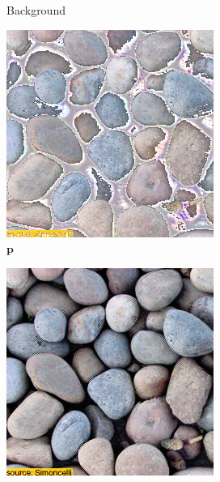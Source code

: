 \begin{figure}[]
\begin{subfigure}{\textwidth}
\begin{subfigure}{0.24\textwidth}
            \caption*{Background}
        \end{subfigure}
        \hfill
        \begin{subfigure}{0.24\textwidth}
            \centering
            \includegraphics[width=\textwidth]{images/04-experiment01/pebbles/1000/threshold_im.jpg}
            \caption*{\(\bm{p}\)}
        \end{subfigure}
        \hfill
        \begin{subfigure}{0.24\textwidth}
            \centering
            \includegraphics[width=\textwidth]{images/04-experiment01/pebbles/1000/threshold_proj.jpg}

\end{subfigure}
\end{subfigure}
\end{figure}
